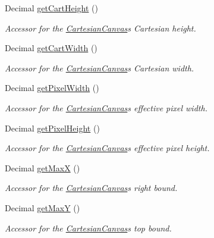 \begin{DoxyCompactItemize}
Decimal \hyperlink{classtsgl_1_1_cartesian_canvas_a66657636eaf20ff465898d3f932063ce}{get\+Cart\+Height} ()
\begin{DoxyCompactList}\small\item\em Accessor for the \hyperlink{classtsgl_1_1_cartesian_canvas}{Cartesian\+Canvas}\textquotesingle{}s Cartesian height. \end{DoxyCompactList}\item 
Decimal \hyperlink{classtsgl_1_1_cartesian_canvas_a829a97323261515097b7589bc96c109c}{get\+Cart\+Width} ()
\begin{DoxyCompactList}\small\item\em Accessor for the \hyperlink{classtsgl_1_1_cartesian_canvas}{Cartesian\+Canvas}\textquotesingle{}s Cartesian width. \end{DoxyCompactList}\item 
Decimal \hyperlink{classtsgl_1_1_cartesian_canvas_ac9bb990b8c34a1575bcb861e4b819372}{get\+Pixel\+Width} ()
\begin{DoxyCompactList}\small\item\em Accessor for the \hyperlink{classtsgl_1_1_cartesian_canvas}{Cartesian\+Canvas}\textquotesingle{}s effective pixel width. \end{DoxyCompactList}\item 
Decimal \hyperlink{classtsgl_1_1_cartesian_canvas_a699c2b41b3b46bfac8649fb38b24c901}{get\+Pixel\+Height} ()
\begin{DoxyCompactList}\small\item\em Accessor for the \hyperlink{classtsgl_1_1_cartesian_canvas}{Cartesian\+Canvas}\textquotesingle{}s effective pixel height. \end{DoxyCompactList}\item 
Decimal \hyperlink{classtsgl_1_1_cartesian_canvas_ae3cbac386f78ecff082b8c4cbd9081ed}{get\+Max\+X} ()
\begin{DoxyCompactList}\small\item\em Accessor for the \hyperlink{classtsgl_1_1_cartesian_canvas}{Cartesian\+Canvas}\textquotesingle{}s right bound. \end{DoxyCompactList}\item 
Decimal \hyperlink{classtsgl_1_1_cartesian_canvas_a68c0616f8180690423d39e9e83045b8c}{get\+Max\+Y} ()
\begin{DoxyCompactList}\small\item\em Accessor for the \hyperlink{classtsgl_1_1_cartesian_canvas}{Cartesian\+Canvas}\textquotesingle{}s top bound. \end{DoxyCompactList}\item 

\end{DoxyCompactItemize}
